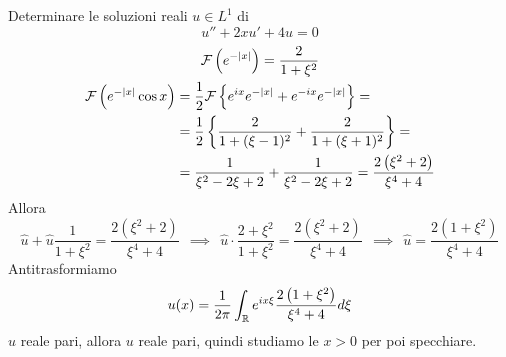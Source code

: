 Determinare le soluzioni reali $u\in L^{1}$ di
\begin{equation*}
u'' + 2xu' + 4u = 0
\end{equation*}
\ParteSoluzioni
\Soluzione
\begin{gather*}
\mathcal{F} \left(e^{ - | x| }\right) = \frac{2}{1 + \xi ^{2}}\\
\begin{aligned}
\mathcal{F} \left(e^{ - | x| }\cos x\right) & = \frac{1}{2}\mathcal{F} \left\{e^{ix} e^{ - | x| } + e^{ - ix} e^{ - | x| }\right\} = \\
 & = \frac{1}{2}\left\{\frac{2}{1 + (\xi - 1)^{2}} + \frac{2}{1 + (\xi + 1)^{2}}\right\} = \\
 & = \frac{1}{\xi ^{2} - 2\xi + 2} + \frac{1}{\xi ^{2} - 2\xi + 2} = \frac{2\left(\xi ^{2} + 2\right)}{\xi ^{4} + 4}
\end{aligned}
\end{gather*}
Allora
\begin{equation*}
\hat{u} + \hat{u}\frac{1}{1 + \xi ^{2}} = \frac{2\left(\xi ^{2} + 2\right)}{\xi ^{4} + 4} \ \ \implies \ \ \hat{u} \cdot \frac{2 + \xi ^{2}}{1 + \xi ^{2}} = \frac{2\left(\xi ^{2} + 2\right)}{\xi ^{4} + 4} \ \ \implies \ \ \hat{u} = \frac{2\left(1 + \xi ^{2}\right)}{\xi ^{4} + 4}
\end{equation*}
Antitrasformiamo
\begin{equation*}
u(x) = \frac{1}{2\pi }\int _{\mathbb{R} } e^{ix\xi }\frac{2\left(1 + \xi ^{2}\right)}{\xi ^{4} + 4} d\xi 
\end{equation*}
$\hat{u}$ reale pari, allora $u$ reale pari, quindi studiamo le $x > 0$ per poi specchiare.

